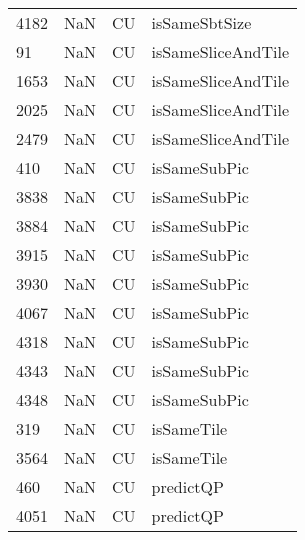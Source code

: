 \begin{tabular}{llll}
4182 &                   NaN &                         CU &                             isSameSbtSize \\
91   &                   NaN &                         CU &                        isSameSliceAndTile \\
1653 &                   NaN &                         CU &                        isSameSliceAndTile \\
2025 &                   NaN &                         CU &                        isSameSliceAndTile \\
2479 &                   NaN &                         CU &                        isSameSliceAndTile \\
410  &                   NaN &                         CU &                              isSameSubPic \\
3838 &                   NaN &                         CU &                              isSameSubPic \\
3884 &                   NaN &                         CU &                              isSameSubPic \\
3915 &                   NaN &                         CU &                              isSameSubPic \\
3930 &                   NaN &                         CU &                              isSameSubPic \\
4067 &                   NaN &                         CU &                              isSameSubPic \\
4318 &                   NaN &                         CU &                              isSameSubPic \\
4343 &                   NaN &                         CU &                              isSameSubPic \\
4348 &                   NaN &                         CU &                              isSameSubPic \\
319  &                   NaN &                         CU &                                isSameTile \\
3564 &                   NaN &                         CU &                                isSameTile \\
460  &                   NaN &                         CU &                                 predictQP \\
4051 &                   NaN &                         CU &                                 predictQP \\

\end{tabular}
